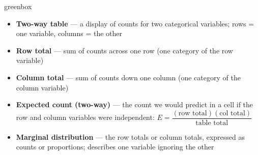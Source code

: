 \documentclass[10pt]{article}
\begin{document}
\begin{skillbox}{greenbox}
\begin{minipage}[t]{0.48\linewidth}
    \begin{itemize}
        \item \textbf{Two-way table} --- a display of counts for two categorical variables;
              rows = one variable, columns = the other
        \item \textbf{Row total} --- sum of counts across one row (one category of the
              row variable)
        \item \textbf{Column total} --- sum of counts down one column (one category of the
              column variable)
    \end{itemize}
\end{minipage}
\hfill
\begin{minipage}[t]{0.48\linewidth}
    \begin{itemize}
        \item \textbf{Expected count (two-way)} --- the count we would predict in a cell
              if the row and column variables were independent:
              $E = \dfrac{(\text{row total})(\text{col total})}{\text{table total}}$
        \item \textbf{Marginal distribution} --- the row totals or column totals, expressed
              as counts or proportions; describes one variable ignoring the other
    \end{itemize}
\end{minipage}
\end{skillbox}
\end{document}
